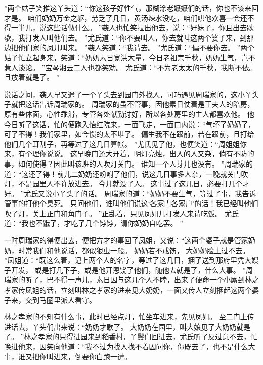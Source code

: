 ”两个姑子笑推这丫头道：“你这孩子好性气，那糊涂老嬷嬷们的话，你也不该来回才是。
咱们奶奶万金之躯，劳乏了几日，黄汤辣水没吃，咱们哄他欢喜一会还不得一半儿，说这些话做什么。
”袭人也忙笑拉出他去，说：“好妹子，你且出去歇歇，我打发人叫他们去。
”尤氏道：“你不要叫人，你去就叫这两个婆子来，到那边把他们家的凤儿叫来。
”袭人笑道：“我请去。
”尤氏道：“偏不要你去。
”两个姑子忙立起身来，笑道：“奶奶素日宽洪大量，今日老祖宗千秋，奶奶生气，岂不惹人谈论。
”宝琴湘云二人也都笑劝。
尤氏道：“不为老太太的千秋，我断不依。
且放着就是了。
”\par
说话之间，袭人早又遣了一个丫头去到园门外找人，可巧遇见周瑞家的，这小丫头子就把这话告诉周瑞家的。
周瑞家的虽不管事，因他素日仗着是王夫人的陪房，
原有些体面，心性乖滑，专管各处献勤讨好，所以各处房里的主人都喜欢他。
他今日听了这话，忙的便跑入怡红院来，一面飞走，一面口内说：“气坏了奶奶了，可了不得！我们家里，如今惯的太不堪了。
偏生我不在跟前，若在跟前，且打给他们几个耳刮子，再等过了这几日算帐。
”尤氏见了他，也便笑道：“周姐姐你来，有个理你说说。
这早晚门还大开着，明灯亮烛，出入的人又杂，倘有不防的事，如何使得？因此叫该班的人吹灯关门。
谁知一个人芽儿也没有。
”周瑞家的道：“这还了得！前儿二奶奶还吩咐了他们，说这几日事多人杂，一晚就关门吹灯，不是园里人不许放进去。
今儿就没了人。
这事过了这几日，必要打几个才好。
”尤氏又说小丫头子的话。
周瑞家的道：“奶奶不要生气，等过了事，我告诉管事的打他个臭死。
只问他们，谁叫他们说这‘各家门各家户’的话！我已经叫他们吹了灯，关上正门和角门子。
”正乱着，只见凤姐儿打发人来请吃饭。
尤氏道：“我也不饿了，才吃了几个饽饽，请你奶奶自吃罢。
”\par
一时周瑞家的得便出去，便把方才的事回了凤姐，又说：“这两个婆子就是管家奶奶，时常我们和他说话，都似狠虫一般。
奶奶若不戒饬，
大奶奶脸上过不去。
”凤姐道：“既这么着，记上两个人的名字，等过了这几日，捆了送到那府里凭大嫂子开发，
或是打几下子，或是他开恩饶了他们，随他去就是了，什么大事。
”周瑞家的听了，巴不得一声儿，素日因与这几个人不睦，出来了便命一个小厮到林之孝家传凤姐的话，立刻叫林之孝家的进来见大奶奶，一面又传人立刻捆起这两个婆子来，交到马圈里派人看守。
\par
林之孝家的不知有什么事，此时已经点灯，忙坐车进来，先见凤姐。
至二门上传进话去，丫头们出来说：“奶奶才歇了。
大奶奶在园里，叫大娘见了大奶奶就是了。
”林之孝家的只得进园来到稻香村，丫鬟们回进去，尤氏听了反过意不去，忙唤进他来，因笑向他道：“我不过为找人找不着因问你，你既去了，也不是什么大事，谁又把你叫进来，倒要你白跑一遭。
